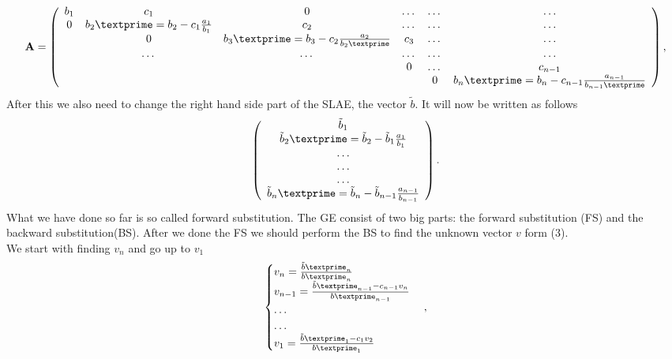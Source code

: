 \documentclass[10pt]{article}
\begin{document}
\begin{equation}
    {\bf A} = \left(\begin{array}{cccccc}
                             b_1& c_1 & 0 &\dots   & \dots &\dots \\
                           0 & {b_2}\textprime=b_2-c_{1}\frac{a_1}{b_1} & c_2 &\dots &\dots &\dots \\
                           & 0 & {b_3}\textprime=b_3-c_{2}\frac{a_2}{{b_2}\textprime} & c_3 & \dots & \dots \\
                           & \dots   & \dots &\dots   &\dots & \dots \\
                           &   &  &0  &\dots & c_{n-1} \\
                           &    &  &   &0 & {b_n}\textprime=b_{n}-c_{n-1}\frac{a_{n-1}}{{b_{n-1}}\textprime} \\
                      \end{array} \right),
\end{equation}
After this we also need to change the right hand side part of the SLAE, the vector $ \tilde{b} $. It will now be written as follows
\begin{equation}
\left(\begin{array}{c}
                           \tilde{b}_1\\
                           {\tilde{b}_2}\textprime=\tilde{b}_2-\tilde{b}_1\frac{a_1}{b_1}\\
                           \dots \\
                           \dots \\
                          \dots \\
                           {\tilde{b}_n}\textprime=\tilde{b}_n - \tilde{b}_{n-1}\frac{a_{n-1}}{b_{n-1}}\\
                      \end{array} \right).
\end{equation}
What we have done so far is so called forward substitution. The GE consist of two big parts: the forward substitution (FS) and the backward substitution(BS). After we done the FS we should perform the BS to find the unknown vector $ v $ form (3). \\
We start with finding $ v_{n} $ and go up to $ v_{1} $
\begin{equation}
\begin{cases}
v_{n}=  \frac{{\tilde{b}\textprime_n}}{{b}\textprime_n}\\ 
v_{n-1}=  \frac{{\tilde{b}\textprime_{n-1}-c_{n-1}v_{n}}}{{b}\textprime_{n-1}}  \\ 
\dots   \\ 
\dots  \\ 
v_{1}= \frac{{\tilde{b}\textprime_{1}-c_{1}v_{2}}}{{b}\textprime_{1}} \\
\end{cases},
\end{equation}
\end{document}
